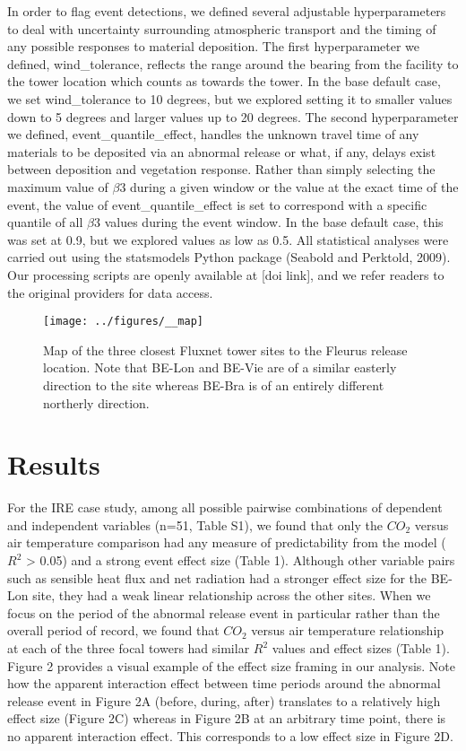\documentclass{article}
\begin{document}
In order to flag event detections, we defined several adjustable hyperparameters to deal with uncertainty surrounding atmospheric transport and the timing of any possible responses to material deposition. The first hyperparameter we defined, wind\_tolerance, reflects the range around the bearing from the facility to the tower location which counts as towards the tower. In the base default case, we set wind\_tolerance to 10 degrees, but we explored setting it to smaller values down to 5 degrees and larger values up to 20 degrees. The second hyperparameter we defined, event\_quantile\_effect, handles the unknown travel time of any materials to be deposited via an abnormal release or what, if any, delays exist between deposition and vegetation response. Rather than simply selecting the maximum value of $\beta$3 during a given window or the value at the exact time of the event, the value of event\_quantile\_effect is set to correspond with a specific quantile of all $\beta$3 values during the event window. In the base default case, this was set at 0.9, but we explored values as low as 0.5. All statistical analyses were carried out using the statsmodels Python package (Seabold and Perktold, 2009). Our processing scripts are openly available at [doi link], and we refer readers to the original providers for data access.

\begin{figure}
	\centering
	\texttt{[image: ../figures/\_\_map]}
	\caption{Map of the three closest Fluxnet tower sites to the Fleurus release location. Note that BE-Lon and BE-Vie are of a similar easterly direction to the site whereas BE-Bra is of an entirely different northerly direction.}
	\label{fig:study_site}
\end{figure}

\section{Results}

For the IRE case study, among all possible pairwise combinations of dependent and independent variables (n=51, Table S1), we found that only the $CO_2$ versus air temperature comparison had any measure of predictability from the model ($R^2$ > 0.05) and a strong event effect size (Table 1). Although other variable pairs such as sensible heat flux and net radiation had a stronger effect size for the BE-Lon site, they had a weak linear relationship across the other sites. When we focus on the period of the abnormal release event in particular rather than the overall period of record, we found that $CO_2$ versus air temperature relationship at each of the three focal towers had similar $R^2$ values and effect sizes (Table 1). Figure 2 provides a visual example of the effect size framing in our analysis. Note how the apparent interaction effect between time periods around the abnormal release event in Figure 2A (before, during, after) translates to a relatively high effect size (Figure 2C) whereas in Figure 2B at an arbitrary time point, there is no apparent interaction effect. This corresponds to a low effect size in Figure 2D. 
\end{document}
